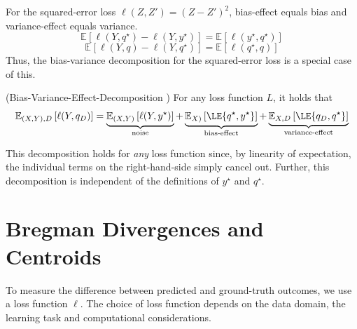 \documentclass[
    a4paper, %
	fontsize=10pt, %
	twoside=false, %
]{kaobook}
\begin{document}
For the squared-error loss $\ell(Z, Z') = (Z - Z')^2$, bias-effect equals bias and variance-effect equals variance.
$$
 \mathbb{E}_{}\left[ \ell(Y, q^\star) - \ell(Y, y^\star) \right]  = \mathbb{E}_{}\left[ \ell(y^\star, q^\star) \right]
$$
$$
 \mathbb{E}_{}\left[ \ell(Y,q) - \ell(Y, q^\star) \right]  = \mathbb{E}_{}\left[ \ell(q^\star, q)  \right] 
$$
Thus, the bias-variance decomposition for the squared-error loss is a special case of this.


\begin{theorem} (Bias-Variance-Effect-Decomposition \cite{james_GeneralizationsBiasVariance_})
\label{thm:bias-variance-effect}
For any loss function $L$, it holds that
\begin{align*}
\mathbb{E}_{(X,Y), D}\left[ \ell(Y, q_{D}) \right]  
&= 
\underbrace{\mathbb{E}_{(X,Y)}\left[ \ell(Y, y^\star) \right]  }_{\text{noise}}
+ \underbrace{\mathbb{E}_{X)}\left[ \LE{q^\star, y^\star} \right] }_{\text{bias-effect}}
+ \underbrace{\mathbb{E}_{X,D}\left[ \LE{q_D, q^\star} \right] }_{\text{variance-effect}}  \\
\end{align*}
\end{theorem}
This decomposition holds for \textit{any} loss function since, by linearity of expectation, the individual terms on the right-hand-side simply cancel out. Further, this decomposition is independent of the definitions of $y^\star$ and $q^\star$.






\section{Bregman Divergences and Centroids}

To measure the difference between predicted and ground-truth outcomes, we use a loss function $\ell$. The choice of loss function depends on the data domain, the learning task and computational considerations. 
\end{document}
